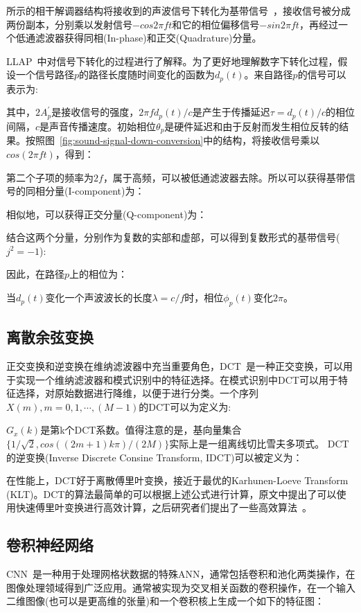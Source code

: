 所示的相干解调器结构将接收到的声波信号下转化为基带信号~\cite{tse2005fundamentals}，接收信号被分成两份副本，分别乘以发射信号$-cos2\pi ft$和它的相位偏移信号$-sin2\pi ft$，再经过一个低通滤波器获得同相(In-phase)和正交(Quadrature)分量。

LLAP~\cite{wang2016device}中对信号下转化的过程进行了解释。为了更好地理解数字下转化过程，假设一个信号路径$p$的路径长度随时间变化的函数为$d_p\left( t\right)$。来自路径$p$的信号可以表示为:

其中，$2A^{'}_{p}$是接收信号的强度，$2\pi fd_{p}\left( t \right)/c$是产生于传播延迟$\tau=d_{p}\left(t\right)/c$的相位间隔，$c$是声音传播速度。初始相位$\theta_p$是硬件延迟和由于反射而发生相位反转的结果。按照图~\ref{fig:sound-signal-down-conversion}中的结构，将接收信号乘以$cos\left( 2\pi ft \right)$，得到：

第二个子项的频率为$2f$，属于高频，可以被低通滤波器去除。所以可以获得基带信号的同相分量(I-component)为：

相似地，可以获得正交分量(Q-component)为：

结合这两个分量，分别作为复数的实部和虚部，可以得到复数形式的基带信号($j^2=-1$):

因此，在路径$p$上的相位为：

当$d_{p}\left(t\right)$变化一个声波波长的长度$\lambda = c/f$时，相位$\phi_{p}\left( t\right)$变化$2\pi$。
\subsection{离散余弦变换}
\label{sec:dct}
正交变换和逆变换在维纳滤波器中充当重要角色，DCT~\cite{ahmed1974discrete}是一种正交变换，可以用于实现一个维纳滤波器和模式识别中的特征选择。在模式识别中DCT可以用于特征选择，对原始数据进行降维，以便于进行分类。一个序列$X(m),m=0,1,\cdots,(M-1)$的DCT可以为定义为:

$G_{x}(k)$是第k个DCT系数。值得注意的是，基向量集合$\{ 1/\sqrt{2}, cos((2m+1)k\pi)/(2M) \}$实际上是一组离线切比雪夫多项式。
DCT的逆变换(Inverse Discrete Consine Transform, IDCT)可以被定义为：

在性能上，DCT好于离散傅里叶变换，接近于最优的Karhunen-Loeve Transform (KLT)。DCT的算法最简单的可以根据上述公式进行计算，原文\cite{ahmed1974discrete}中提出了可以使用快速傅里叶变换进行高效计算，之后研究者们提出了一些高效算法~\cite{winograd1978computing,lee1984new,hou1987fast}。

\subsection{卷积神经网络}
CNN~\cite{goodfellow2016deep}是一种用于处理网格状数据的特殊ANN，通常包括卷积和池化两类操作，在图像处理领域得到广泛应用。通常被实现为交叉相关函数的卷积操作，在一个输入二维图像(也可以是更高维的张量)和一个卷积核上生成一个如下的特征图：


